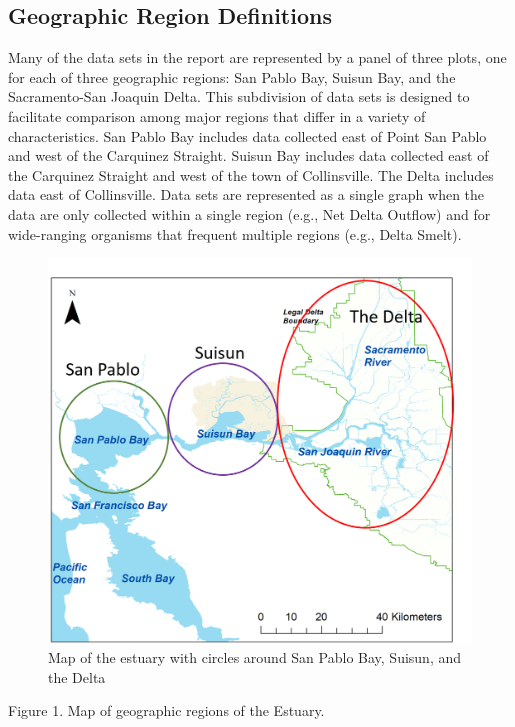 \documentclass[
]{book}
\begin{document}
\hypertarget{geographic-region-definitions}{%
\subsection{Geographic Region Definitions}\label{geographic-region-definitions}}

Many of the data sets in the report are represented by a panel of three plots, one for each of three geographic regions: San Pablo Bay, Suisun Bay, and the Sacramento-San Joaquin Delta. This subdivision of data sets is designed to facilitate comparison among major regions that differ in a variety of characteristics. San Pablo Bay includes data collected east of Point San Pablo and west of the Carquinez Straight. Suisun Bay includes data collected east of the Carquinez Straight and west of the town of Collinsville. The Delta includes data east of Collinsville. Data sets are represented as a single graph when the data are only collected within a single region (e.g., Net Delta Outflow) and for wide-ranging organisms that frequent multiple regions (e.g., Delta Smelt).

\begin{figure}
\includegraphics[width=15.62in]{figures/map} \caption{Map of the estuary with circles around San Pablo Bay, Suisun, and the Delta}\label{fig:unnamed-chunk-186}
\end{figure}

Figure 1. Map of geographic regions of the Estuary.
\end{document}
